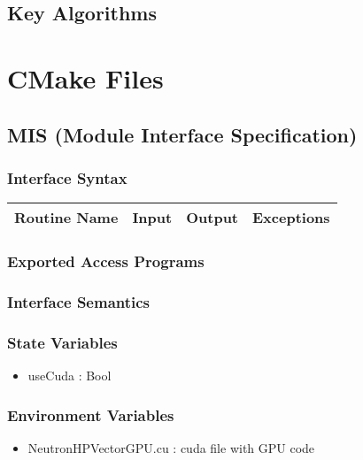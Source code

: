 \documentclass[12pt]{article}
\begin{document}
\subsection{Key Algorithms}

\section{CMake Files}

\subsection{MIS (Module Interface Specification)}
\subsubsection{Interface Syntax}%
\begin{tabular}{| p{} | p{} | p{} |  p{} |}
\hline
\bf Routine Name & \bf Input & \bf Output & \bf Exceptions \\ \hline
\end{tabular}

\subsubsection{Exported Access Programs}%

\subsubsection{Interface Semantics}

\subsubsection{State Variables}%
\begin{itemize}
\item useCuda : Bool
\end{itemize}

\subsubsection{Environment Variables}%
\begin{itemize}
\item NeutronHPVectorGPU.cu : cuda file with GPU code
\end{itemize}
\end{document}
